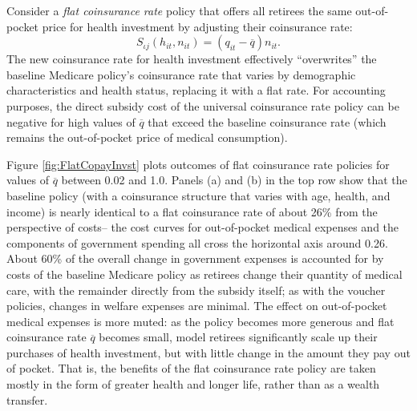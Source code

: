 \documentclass[12pt,pdftex,letterpaper]{article}
\newcommand{\Type}{\iota}
\newcommand{\Health}{h}
\newcommand{\Invst}{n}
\newcommand{\Copay}{q}
\newcommand{\Subsidy}{S}
\newcommand{\Age}{j}
\begin{document}
Consider a \textit{flat coinsurance rate} policy that offers all retirees the same out-of-pocket price for health investment by adjusting their coinsurance rate:
\begin{equation}
\Subsidy_{\Type \Age}(\Health_{it},\Invst_{it})  =  (\Copay_{it} - \overline{\Copay})\Invst_{it}.
\end{equation}
The new coinsurance rate for health investment effectively ``overwrites'' the baseline Medicare policy's coinsurance rate that varies by demographic characteristics and health status, replacing it with a flat rate. For accounting purposes, the direct subsidy cost of the universal coinsurance rate policy can be negative for high values of $\overline{\Copay}$ that exceed the baseline coinsurance rate (which remains the out-of-pocket price of medical consumption). 

Figure \ref{fig:FlatCopayInvst} plots outcomes of flat coinsurance rate policies for values of $\overline{\Copay}$ between 0.02 and 1.0.  Panels (a) and (b) in the top row show that the baseline policy (with a coinsurance structure that varies with age, health, and income) is nearly identical to a flat coinsurance rate of about 26\% from the perspective of costs-- the cost curves for out-of-pocket medical expenses and the components of government spending all cross the horizontal axis around 0.26.  About 60\% of the overall change in government expenses is accounted for by costs of the baseline Medicare policy as retirees change their quantity of medical care, with the remainder directly from the subsidy itself; as with the voucher policies, changes in welfare expenses are minimal.  The effect on out-of-pocket medical expenses is more muted: as the policy becomes more generous and flat coinsurance rate $\overline{\Copay}$ becomes small, model retirees significantly scale up their purchases of health investment, but with little change in the amount they pay out of pocket.  That is, the benefits of the flat coinsurance rate policy are taken mostly in the form of greater health and longer life, rather than as a wealth transfer.
\end{document}
